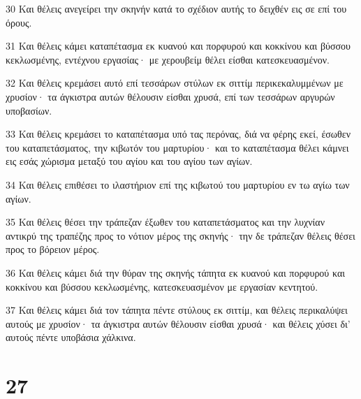 \par 30 Και θέλεις ανεγείρει την σκηνήν κατά το σχέδιον αυτής το δειχθέν εις σε επί του όρους.
\par 31 Και θέλεις κάμει καταπέτασμα εκ κυανού και πορφυρού και κοκκίνου και βύσσου κεκλωσμένης, εντέχνου εργασίας· με χερουβείμ θέλει είσθαι κατεσκευασμένον.
\par 32 Και θέλεις κρεμάσει αυτό επί τεσσάρων στύλων εκ σιττίμ περικεκαλυμμένων με χρυσίον· τα άγκιστρα αυτών θέλουσιν είσθαι χρυσά, επί των τεσσάρων αργυρών υποβασίων.
\par 33 Και θέλεις κρεμάσει το καταπέτασμα υπό τας περόνας, διά να φέρης εκεί, έσωθεν του καταπετάσματος, την κιβωτόν του μαρτυρίου· και το καταπέτασμα θέλει κάμνει εις εσάς χώρισμα μεταξύ του αγίου και του αγίου των αγίων.
\par 34 Και θέλεις επιθέσει το ιλαστήριον επί της κιβωτού του μαρτυρίου εν τω αγίω των αγίων.
\par 35 Και θέλεις θέσει την τράπεζαν έξωθεν του καταπετάσματος και την λυχνίαν αντικρύ της τραπέζης προς το νότιον μέρος της σκηνής· την δε τράπεζαν θέλεις θέσει προς το βόρειον μέρος.
\par 36 Και θέλεις κάμει διά την θύραν της σκηνής τάπητα εκ κυανού και πορφυρού και κοκκίνου και βύσσου κεκλωσμένης, κατεσκευασμένον με εργασίαν κεντητού.
\par 37 Και θέλεις κάμει διά τον τάπητα πέντε στύλους εκ σιττίμ, και θέλεις περικαλύψει αυτούς με χρυσίον· τα άγκιστρα αυτών θέλουσιν είσθαι χρυσά· και θέλεις χύσει δι' αυτούς πέντε υποβάσια χάλκινα.

\chapter{27}

